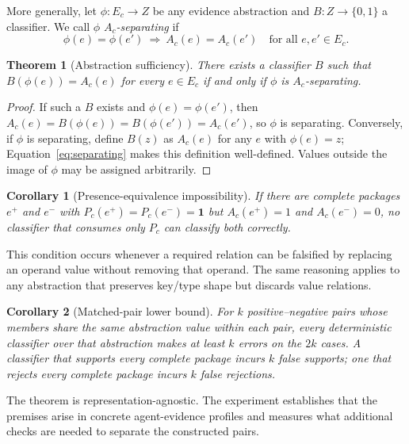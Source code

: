 \documentclass[preprint,12pt]{elsarticle}
\newtheorem{theorem}{Theorem}
\newtheorem{corollary}{Corollary}
\begin{document}
More generally, let $\phi:E_c\rightarrow Z$ be any evidence abstraction and $B:Z\rightarrow\{0,1\}$ a classifier. We call $\phi$ \emph{$A_c$-separating} if
\begin{equation}
 \phi(e)=\phi(e')\ \Longrightarrow\ A_c(e)=A_c(e')
 \quad\text{for all }e,e'\in E_c.
 \label{eq:separating}
\end{equation}

\begin{theorem}[Abstraction sufficiency]
There exists a classifier $B$ such that $B(\phi(e))=A_c(e)$ for every $e\in E_c$ if and only if $\phi$ is $A_c$-separating.
\end{theorem}

\begin{proof}
If such a $B$ exists and $\phi(e)=\phi(e')$, then $A_c(e)=B(\phi(e))=B(\phi(e'))=A_c(e')$, so $\phi$ is separating. Conversely, if $\phi$ is separating, define $B(z)$ as $A_c(e)$ for any $e$ with $\phi(e)=z$; Equation~\ref{eq:separating} makes this definition well-defined. Values outside the image of $\phi$ may be assigned arbitrarily.
\end{proof}

\begin{corollary}[Presence-equivalence impossibility]
If there are complete packages $e^+$ and $e^-$ with $P_c(e^+)=P_c(e^-)=\mathbf{1}$ but $A_c(e^+)=1$ and $A_c(e^-)=0$, no classifier that consumes only $P_c$ can classify both correctly.
\end{corollary}

This condition occurs whenever a required relation can be falsified by replacing an operand value without removing that operand. The same reasoning applies to any abstraction that preserves key/type shape but discards value relations.

\begin{corollary}[Matched-pair lower bound]
For $k$ positive--negative pairs whose members share the same abstraction value within each pair, every deterministic classifier over that abstraction makes at least $k$ errors on the $2k$ cases. A classifier that supports every complete package incurs $k$ false supports; one that rejects every complete package incurs $k$ false rejections.
\end{corollary}

The theorem is representation-agnostic. The experiment establishes that the premises arise in concrete agent-evidence profiles and measures what additional checks are needed to separate the constructed pairs.
\end{document}
